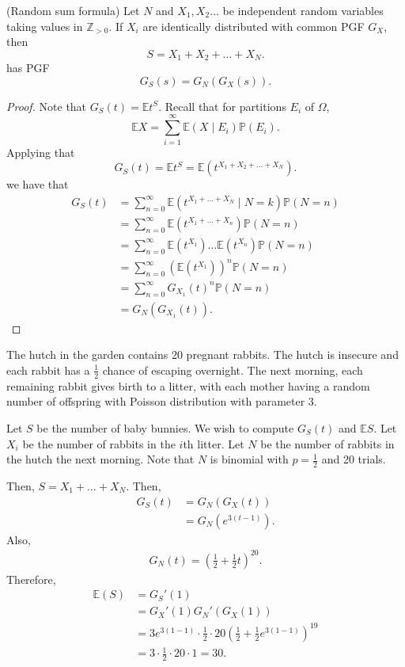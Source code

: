 \begin{theorem}
	(Random sum formula) Let \( N \) and \( X_{1}, X_{2}\ldots  \) be independent random variables taking values in \( \mathbb{Z}_{>0} \). If \( X_i \) are identically distributed with common PGF \( G_X \), then \[
		S = X_{1}+X_{2}+\ldots +X_N
	.\] has PGF \[
		G_S(s) = G_N(G_X(s))
	.\] 
\end{theorem}
\begin{proof}
	Note that \( G_S(t) = \mathbb{E}t ^{S}  \). Recall that for partitions \( E_i \) of \( \Omega  \), \[
		\mathbb{E}X = \sum_{i=1}^{\infty} \mathbb{E}(X \mid E_i)\mathbb{P}(E_i)
	.\] Applying that \[
		G_S(t) = \mathbb{E}t ^{S} = \mathbb{E}(t ^{X_{1}+X_{2}+\ldots +X_N} )
	.\] we have that 
	\begin{align*}
		G_S(t) &= \sum_{n=0}^{\infty} \mathbb{E}(t ^{X_{1}+\ldots +X_N} \mid N=k)\mathbb{P}(N=n) \\
		&= \sum_{n=0}^{\infty} \mathbb{E}(t ^{X_{1}+\ldots +X_n} ) \mathbb{P}(N=n) \\
		&= \sum_{n=0}^{\infty} \mathbb{E}(t ^{X_{1}} )\ldots \mathbb{E}(t ^{X_n} ) \mathbb{P}(N=n) \\
		&= \sum_{n=0}^{\infty} (\mathbb{E}(t ^{X_{1}} ))^{n} \mathbb{P}(N=n)  \\
		&= \sum_{n=0}^{\infty} G_{X_1}(t)^{n} \mathbb{P}(N=n)  \\
		&= G_N(G_{X_{1}}(t))
	.\end{align*}
\end{proof}

\begin{eg}
	The hutch in the garden contains 20 pregnant rabbits. The hutch is insecure and each rabbit has a \( \frac{1}{2} \) chance of escaping overnight. The next morning, each remaining rabbit gives birth to a litter, with each mother having a random number of offspring with Poisson distribution with parameter 3.
\end{eg}
\begin{explanation}
	Let \( S \) be the number of baby bunnies. We wish to compute \( G_S(t) \) and \( \mathbb{E}S \). Let \( X_i \) be the number of rabbits in the \( i \)th litter. Let \( N \) be the number of rabbits in the hutch the next morning. Note that \( N \) is binomial with \( p=\frac{1}{2} \) and 20 trials.

	Then, \( S = X_{1}+\ldots +X_N \). Then, 
	\begin{align*}
		G_S(t) &= G_N(G_X(t)) \\
		&= G_N(e^{3(t-1)} ) 
	.\end{align*}
	Also, 
	\begin{align*}
		G_N(t) = \left(\frac{1}{2} + \frac{1}{2}t\right)^{20} 
	.\end{align*}
	Therefore, 
	\begin{align*}
		\mathbb{E}(S) &= G_S'(1) \\
									&= G_X'(1) G_N'(G_X(1)) \\
									&= 3e^{3(1-1)} \cdot \frac{1}{2}\cdot 20 \left( \frac{1}{2} + \frac{1}{2}e^{3(1-1) }  \right)^{19}  \tag{at \( t=1 \)} \\
		&= 3 \cdot \frac{1}{2} \cdot 20 \cdot 1 = 30 
	.\end{align*}
\end{explanation}
